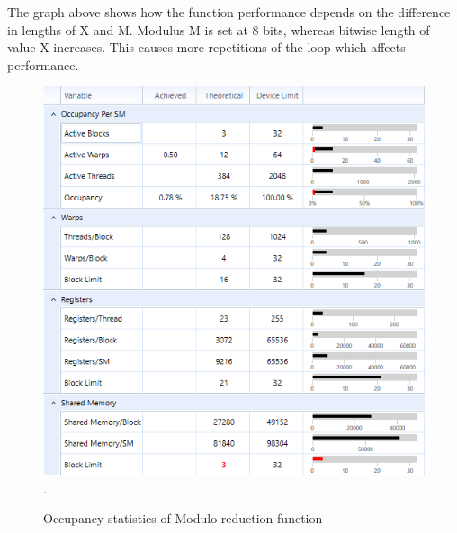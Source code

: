 \documentclass[oneside,openright,12pt,final,en]{mgr}
\begin{document}
The graph above shows how the function performance depends on the difference in lengths of X and M. Modulus M is set at 8 bits, whereas bitwise length of value X increases. This causes more repetitions of the loop which affects performance. 

\begin{figure}[H]
	\centering
	\includegraphics[width=\textwidth]{mod_occupancy}.
	\caption{Occupancy statistics of Modulo reduction function}
	\label{fig:mod_occupancy}
\end{figure}
\end{document}
